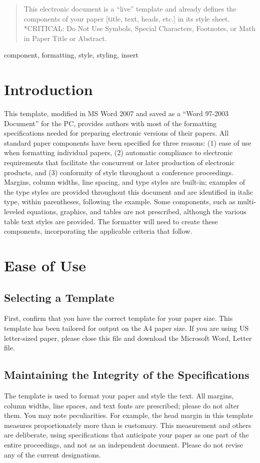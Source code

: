 \documentclass[a4paper,conference]{IEEEtran}
\begin{document}
\begin{abstract}
This electronic document is a “live” template and already defines the components of your paper [title, text, heads, etc.] in its style sheet. *CRITICAL: Do Not Use Symbols, Special Characters, Footnotes, or Math in Paper Title or Abstract.
\end{abstract}

\begin{IEEEkeywords}
component, formatting, style, styling, insert
\end{IEEEkeywords}

\section{Introduction}
This template, modified in MS Word 2007 and saved as a “Word 97-2003 Document” for the PC, provides authors with most of the formatting specifications needed for preparing electronic versions of their papers. All standard paper components have been specified for three reasons: (1) ease of use when formatting individual papers, (2) automatic compliance to electronic requirements that facilitate the concurrent or later production of electronic products, and (3) conformity of style throughout a conference proceedings. Margins, column widths, line spacing, and type styles are built-in; examples of the type styles are provided throughout this document and are identified in italic type, within parentheses, following the example. Some components, such as multi-leveled equations, graphics, and tables are not prescribed, although the various table text styles are provided. The formatter will need to create these components, incorporating the applicable criteria that follow.

\section{Ease of Use}

\subsection{Selecting a Template}
First, confirm that you have the correct template for your paper size. This template has been tailored for output on the A4 paper size. If you are using US letter-sized paper, please close this file and download the Microsoft Word, Letter file.

\subsection{Maintaining the Integrity of the Specifications}
The template is used to format your paper and style the text. All margins, column widths, line spaces, and text fonts are prescribed; please do not alter them. You may note peculiarities. For example, the head margin in this template measures proportionately more than is customary. This measurement and others are deliberate, using specifications that anticipate your paper as one part of the entire proceedings, and not as an independent document. Please do not revise any of the current designations.
\end{document}
